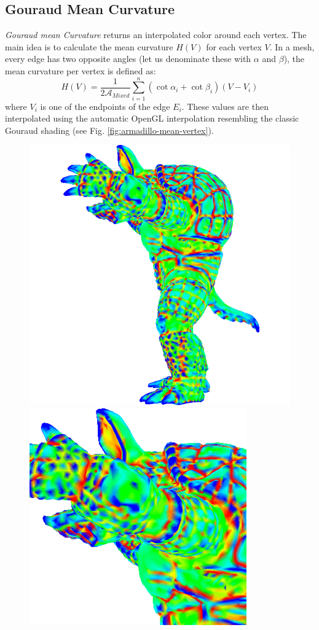 \subsection{Gouraud Mean Curvature}
\textit{Gouraud mean Curvature} returns an interpolated color around each vertex. The main idea is to calculate the mean curvature $H(V)$ for each vertex $V$. In a mesh, every edge has two opposite angles (let us denominate these with $\alpha$ and $\beta$), the mean curvature per vertex is defined as:
$$H(V) = \frac{1}{2\mathcal{A}_{Mixed}} \sum_{i=1}^{n}(\cot \alpha_i + \cot \beta_i) (V - V_i)$$
where $V_i$ is one of the endpoints of the edge $E_i$.
These values are then interpolated using the automatic OpenGL interpolation resembling the classic Gouraud shading (see Fig. \ref{fig:armadillo-mean-vertex}).

\begin{figure}[!h]
    \centering
    \centering
    \includegraphics[scale=0.24]{images/mean-curvature-vertex.png}
    \endminipage\hfill
    \centering
    \includegraphics[scale=0.5]{images/mean-curvature-vertex-detail.png}

\end{figure}
